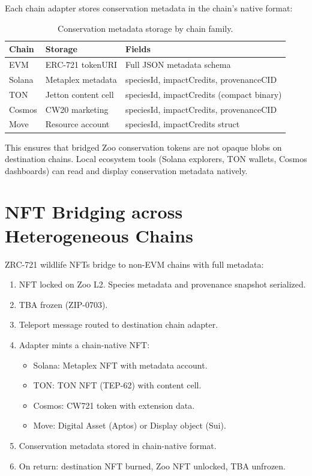 \documentclass[11pt,letterpaper]{article}
\begin{document}
Each chain adapter stores conservation metadata in the chain's native format:

\begin{table}[t]
\centering
\begin{tabular}{llp{4.5cm}}
\toprule
\textbf{Chain} & \textbf{Storage} & \textbf{Fields} \\
\midrule
EVM & ERC-721 tokenURI & Full JSON metadata schema \\
Solana & Metaplex metadata & speciesId, impactCredits, provenanceCID \\
TON & Jetton content cell & speciesId, impactCredits (compact binary) \\
Cosmos & CW20 marketing & speciesId, impactCredits, provenanceCID \\
Move & Resource account & speciesId, impactCredits struct \\
\bottomrule
\end{tabular}
\caption{Conservation metadata storage by chain family.}
\label{tab:metadata}
\end{table}

This ensures that bridged Zoo conservation tokens are not opaque blobs on destination chains. Local ecosystem tools (Solana explorers, TON wallets, Cosmos dashboards) can read and display conservation metadata natively.

\section{NFT Bridging across Heterogeneous Chains}

ZRC-721 wildlife NFTs bridge to non-EVM chains with full metadata:

\begin{enumerate}
    \item NFT locked on Zoo L2. Species metadata and provenance snapshot serialized.
    \item TBA frozen (ZIP-0703).
    \item Teleport message routed to destination chain adapter.
    \item Adapter mints a chain-native NFT:
    \begin{itemize}
        \item Solana: Metaplex NFT with metadata account.
        \item TON: TON NFT (TEP-62) with content cell.
        \item Cosmos: CW721 token with extension data.
        \item Move: Digital Asset (Aptos) or Display object (Sui).
    \end{itemize}
    \item Conservation metadata stored in chain-native format.
    \item On return: destination NFT burned, Zoo NFT unlocked, TBA unfrozen.
\end{enumerate}
\end{document}
